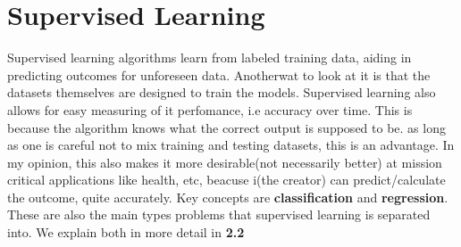 \documentclass[11pt]{article}
\begin{document}
\section{Supervised Learning}
Supervised learning algorithms learn from labeled training data, aiding in predicting outcomes for unforeseen data. Anotherwat to look at it is that the datasets themselves are designed to train the models. Supervised learning also allows for easy measuring of it perfomance, i.e accuracy over time. This is because the algorithm knows what the correct output is supposed to be. as long as one is careful not to mix training and testing datasets, this is an advantage. In my opinion, this also makes it more desirable(not necessarily better) at mission critical applications like health, etc, beacuse i(the creator) can predict/calculate the outcome, quite accurately.
 Key concepts are \textbf{classification} and \textbf{regression}. These are also the main types problems that supervised learning is separated into. We explain both in more detail in \textbf{2.2}
\end{document}
